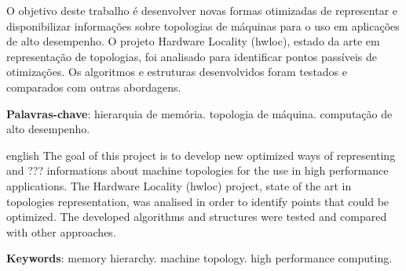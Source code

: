 
\imprimircapa
\imprimirfolhaderosto%

\begin{resumo}


	O objetivo deste trabalho é desenvolver novas formas otimizadas de representar e disponibilizar informações sobre topologias de máquinas para o uso em aplicações de alto desempenho. O projeto Hardware Locality (hwloc), estado da arte em representação de topologias, foi analisado para identificar pontos passíveis de otimizações. Os algoritmos e estruturas desenvolvidos foram testados e comparados com outras abordagens.
	
	\vspace{\onelineskip}
	
	\textbf{Palavras-chave}: hierarquia de memória. topologia de máquina. computação de alto desempenho.
\end{resumo}

\begin{resumo}[Abstract]
	\begin{otherlanguage*}{english}
		The goal of this project is to develop new optimized ways of representing and ??? informations about machine topologies for the use in high performance applications.
		The Hardware Locality (hwloc) project, state of the art in topologies representation, was analised in order to identify points that could be optimized. The developed algorithms and structures were tested and compared with other approaches.
		
		\vspace{\onelineskip}
		
		\textbf{Keywords}: memory hierarchy. machine topology. high performance computing.
	\end{otherlanguage*}
\end{resumo}

